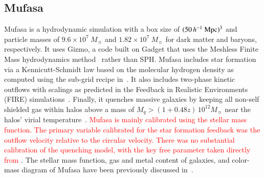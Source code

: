 \documentclass[tighten, preprint]{aastex62}
\begin{document}
\subsection{{\sc Mufasa}} \label{sec:mufasa}
{\sc Mufasa} is a hydrodynamic simulation with a box size of 
$(50\,h^{-1}\ {\rm Mpc})^3$ and particle masses of $9.6 \times 10^7\ M_{\sun}$ 
and $1.82 \times 10^7\ M_{\sun}$ for dark matter and baryons, respectively. 
It  uses {\sc Gizmo}, a code built on {\sc Gadget} that uses the Meshless 
Finite Mass hydrodynamics method~\citep{hopkins2015a} rather than SPH.  %
{\sc Mufasa} includes star formation via a Kennicutt-Schmidt law based on the  molecular hydrogen 
density as computed using the sub-grid recipe in~\cite{krumholz2011}. 
It also includes two-phase kinetic outflows with scalings as predicted 
in the Feedback in Realistic Environments (FIRE) simulations~\citep{muratov2015}.
Finally, it quenches massive galaxies by keeping all non-self shielded 
gas within halos above a mass of $M_q>(1+0.48 z)\,10^{12}M_\sun$ %
near the halos' virial temperature~\citep{gabor2015, mitra2015}. 
\textcolor{red}{{\sc Mufasa} is mainly calibrated using the 
stellar mass function. The primary variable calibrated for the 
star formation feedback was the outflow velocity relative to the circular 
velocity. There was no substantial calibration of the quenching model, 
with the key free parameter taken directly from \citep{mitra2015}}. 
The stellar mass function, gas and metal content of galaxies, and 
color-mass  diagram of {\sc Mufasa} have been previously discussed 
in~\citet{dave2016,dave2017,dave2017a}.
\end{document}
